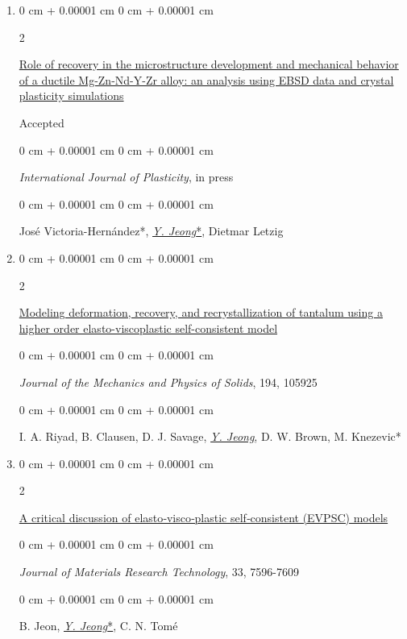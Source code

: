 \documentclass[10pt, letterpaper]{article}
\newenvironment{onecolentry}{
    \begin{adjustwidth}{
        0 cm + 0.00001 cm
    }{
        0 cm + 0.00001 cm
    }
}{
    \end{adjustwidth}
} %
\newenvironment{twocolentry}[2][]{
    \onecolentry
    \def\secondColumn{#2}
    \setcolumnwidth{\fill, 4.5 cm}
    \begin{paracol}{2}
}{
    \switchcolumn \raggedleft \secondColumn
    \end{paracol}
    \endonecolentry
} %
\begin{document}
\begin{enumerate}
        \item
          \begin{twocolentry}{Accepted}
            \href{https://doi.org/10.1016/j.ijplas.2025.104380}{Role of recovery in the microstructure development and mechanical behavior of a ductile Mg-Zn-Nd-Y-Zr alloy: an analysis using EBSD data and crystal plasticity simulations}
        \end{twocolentry}
        \begin{onecolentry}
            {\it International Journal of Plasticity}, in press
        \end{onecolentry}
        \begin{onecolentry}
            José Victoria-Hernández*, {\underline{\textit{Y. Jeong}*}}, Dietmar Letzig
        \end{onecolentry}
        \vspace{0.10 cm}


        \item
        \begin{twocolentry}{2025}
            \href{https://doi.org/10.1016/j.jmps.2024.105925}{Modeling deformation, recovery, and recrystallization of tantalum using a higher order elasto-viscoplastic self-consistent model}
        \end{twocolentry}
        \begin{onecolentry}
            {\it Journal of the Mechanics and Physics of Solids}, 194, 105925
        \end{onecolentry}
        \begin{onecolentry}
            I. A. Riyad, B. Clausen, D. J. Savage, {\underline{\textit{Y. Jeong}}}, D. W. Brown, M. Knezevic*
        \end{onecolentry}
        \vspace{0.10 cm}

        \item
        \begin{twocolentry}{2024}
            \href{https://doi.org/10.1016/j.jmrt.2024.11.043}{A critical discussion of elasto‑visco‑plastic self‑consistent (EVPSC) models}
        \end{twocolentry}
        \begin{onecolentry}
            {\it Journal of Materials Research Technology}, 33, 7596-7609
        \end{onecolentry}
        \begin{onecolentry}
            B. Jeon, {\underline{\textit{Y. Jeong}*}}, C. N. Tomé
        \end{onecolentry}
        \vspace{0.10 cm}


\end{enumerate}
\end{document}
